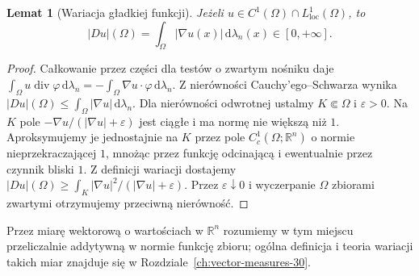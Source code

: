 \documentclass[11pt,a4paper,oneside]{book}
\numberwithin{equation}{chapter}
\theoremstyle{plain}
\newtheorem{lemat}[twierdzenie]{Lemat}
\theoremstyle{definition}
\theoremstyle{remark}
\begin{document}
\begin{lemat}[Wariacja gładkiej funkcji]
\label{lem:BV-smooth-29}
Jeżeli $u\in C^1(\Omega)\cap L^1_{\mathrm{loc}}(\Omega)$,
to
\[
 |Du|(\Omega)=\int_\Omega|\nabla u(x)|
 \,\mathrm d\lambda_n(x)\in[0,+\infty].
\]
\end{lemat}
\begin{proof}
Całkowanie przez części dla testów o zwartym nośniku
daje $\int_\Omega u\operatorname{div}\varphi\,\mathrm d\lambda_n=-\int_\Omega\nabla u\cdot\varphi\,\mathrm d\lambda_n$.
Z nierówności Cauchy'ego--Schwarza wynika
$|Du|(\Omega)\le\int_\Omega|\nabla u|\,\mathrm d\lambda_n$.
Dla nierówności odwrotnej ustalmy $K\Subset\Omega$
i $\varepsilon>0$. Na $K$ pole
$-\nabla u/(|\nabla u|+\varepsilon)$ jest ciągłe i ma normę
nie większą niż $1$. Aproksymujemy je jednostajnie na
$K$ przez pole $C_c^1(\Omega;\mathbb R^n)$ o normie
nieprzekraczającej $1$, mnożąc przez funkcję odcinającą
i ewentualnie przez czynnik bliski $1$.
Z definicji wariacji dostajemy
$|Du|(\Omega)\ge\int_K|\nabla u|^2/(|\nabla u|+\varepsilon)$.
Przez $\varepsilon\downarrow0$ i wyczerpanie $\Omega$
zbiorami zwartymi otrzymujemy przeciwną nierówność.
\end{proof}

Przez miarę wektorową o wartościach w $\mathbb R^n$
rozumiemy w tym miejscu przeliczalnie addytywną
w normie funkcję zbioru; ogólna definicja i teoria
wariacji takich miar znajduje się w
Rozdziale~\ref{ch:vector-measures-30}.
\end{document}
